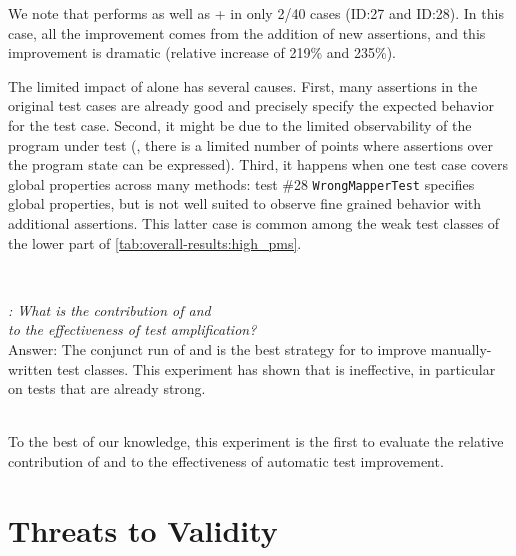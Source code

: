 We note that \Aampl{} performs as well as \Iampl + \Aampl in only 2/40 cases (ID:27 and ID:28). In this case, all the improvement comes from the addition of new assertions, and this improvement is dramatic (relative increase of 219\% and 235\%).

The limited impact of \Aampl alone has several causes. First, many assertions in the original test cases are already good and precisely specify the expected behavior for the test case.
Second, it might be due to the limited observability of the program under test (\ie, there is a limited number of points where assertions over the program state can be expressed).
Third, it happens when one test case covers global properties across many methods: test \#28 \texttt{WrongMapperTest} specifies global properties, but is not well suited to observe fine grained behavior with additional assertions. This latter case is common among the weak test classes of the lower part of \autoref{tab:overall-results:high_pms}.


~\\

\begin{mdframed}
	\textit{\rqAmplVersusIAmpl: What is the contribution of \Iampl{} and \\\Aampl{} to the effectiveness of test amplification?}\\
	Answer: The conjunct run of \Iampl{} and \Aampl{} is the best strategy for \dspot{} to improve manually-written test classes. This experiment has shown that \Aampl{} is ineffective, in particular on tests that are already strong.
\end{mdframed}
~\\

To the best of our knowledge, this experiment is the first to evaluate the relative contribution of \Iampl and \Aampl to the effectiveness of automatic test improvement.

\section{Threats to Validity}
\label{sec:threats}

